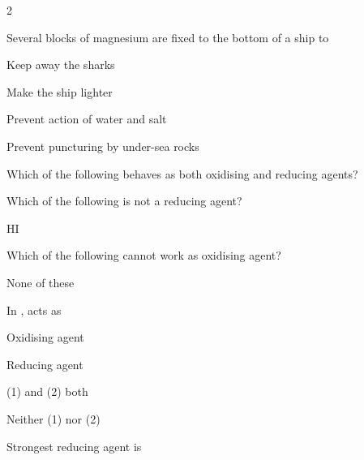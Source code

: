 \documentclass[10pt,a4paper]{article}
\begin{document}
\begin{multicols}{2}
\begin{questions}[start=1]
\item Several blocks of magnesium are fixed to the bottom of a ship to
\begin{options}
  \item Keep away the sharks
  \item Make the ship lighter
  \item Prevent action of water and salt
  \item Prevent puncturing by under-sea rocks
\end{options}

\item Which of the following behaves as both oxidising and reducing agents?
\begin{options}
  \item {}
  \item {}
  \item {}
  \item {}
\end{options}

\item Which of the following is not a reducing agent?
\begin{options}
  \item {}
  \item {}
  \item HI
  \item {}
\end{options}

\item Which of the following cannot work as oxidising agent?
\begin{options}
  \item {}
  \item {}
  \item {}
  \item None of these
\end{options}

\item In ,  acts as
\begin{options}
  \item Oxidising agent
  \item Reducing agent
  \item (1) and (2) both
  \item Neither (1) nor (2)
\end{options}

\item Strongest reducing agent is
\begin{options}
  \item {}
  \item {}
  \item {}
  \item {}
\end{options}


\end{questions}
\end{multicols}
\end{document}
